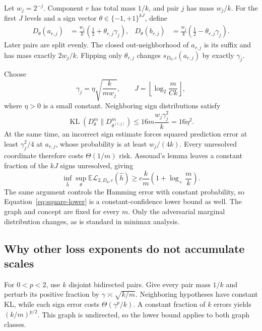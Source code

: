 \documentclass{article}
\theoremstyle{definition}
\theoremstyle{remark}
\newcommand{\E}{\mathbb E}
\newcommand{\risk}{\mathcal L}
\DeclareMathOperator{\KL}{KL}
\begin{document}
Let $w_j=2^{-j}$. Component $r$ has total mass $1/k$, and pair $j$ has mass $w_j/k$. For the first $J$ levels and a sign vector $\theta\in\{-1,+1\}^{kJ}$, define
\begin{align}
D_\theta(a_{r,j})&=\frac{w_j}{k}\left(\frac12+\theta_{r,j}\gamma_j\right),&
D_\theta(b_{r,j})&=\frac{w_j}{k}\left(\frac12-\theta_{r,j}\gamma_j\right). \label{eq:harddist}
\end{align}
Later pairs are split evenly. The closed out-neighborhood of $a_{r,j}$ is its suffix and has mass exactly $2w_j/k$. Flipping only $\theta_{r,j}$ changes $s_{D_\theta,c}(a_{r,j})$ by exactly $\gamma_j$.

Choose
\begin{equation}
\gamma_j=\eta\sqrt{\frac{k}{mw_j}},
\qquad
J=\left\lfloor\log_2\frac{m}{Ck}\right\rfloor, \label{eq:gamma}
\end{equation}
where $\eta>0$ is a small constant. Neighboring sign distributions satisfy
\begin{equation}
\KL(D_\theta^m\|D_{\theta^{(r,j)}}^m)
\leq16m\frac{w_j\gamma_j^2}{k}=16\eta^2. \label{eq:kl}
\end{equation}
At the same time, an incorrect sign estimate forces squared prediction error at least $\gamma_j^2/4$ at $a_{r,j}$, whose probability is at least $w_j/(4k)$. Every unresolved coordinate therefore costs $\Theta(1/m)$ risk. Assouad's lemma leaves a constant fraction of the $kJ$ signs unresolved, giving
\begin{equation}
\inf_{\widehat h}\sup_\theta \E\risk_{2,D_\theta,c}(\widehat h)
\geq c\frac{k}{m}\left(1+\log_+\frac{m}{k}\right). \label{eq:square-lower}
\end{equation}
The same argument controls the Hamming error with constant probability, so Equation~\eqref{eq:square-lower} is a constant-confidence lower bound as well. The graph and concept are fixed for every $m$. Only the adversarial marginal distribution changes, as is standard in minimax analysis.

\subsection{Why other loss exponents do not accumulate scales}

For $0<p<2$, use $k$ disjoint bidirected pairs. Give every pair mass $1/k$ and perturb its positive fraction by $\gamma\asymp\sqrt{k/m}$. Neighboring hypotheses have constant KL, while each sign error costs $\Theta(\gamma^p/k)$. A constant fraction of $k$ errors yields $(k/m)^{p/2}$. This graph is undirected, so the lower bound applies to both graph classes.
\end{document}
